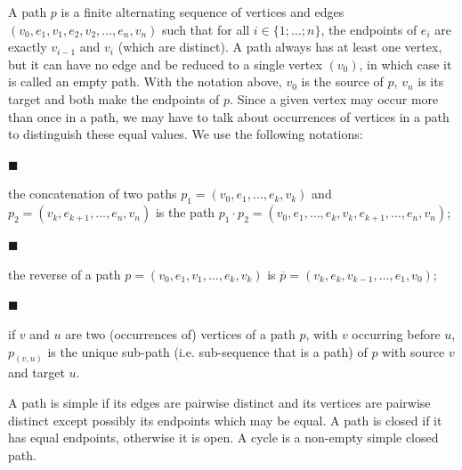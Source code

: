 \documentclass[10pt,a4paper]{amsart}
\begin{document}
 
A path $p$ is a finite alternating sequence of vertices and edges $(v_{0},e_{1},v_{1},e_{2},v_{2},\dots,e_{n},v_{n})$ such that for all $i\in\{1;\dots;n\}$, the endpoints of $e_{i}$ are exactly $v_{i-1}$ and $v_{i}$ (which are distinct). A path always has at least one vertex, but it can have no edge and be reduced to a single vertex $(v_{0})$, in which case it is called an empty path. With the notation above, $v_{0}$ is the source of $p$, $v_{n}$ is its target and both make the endpoints of $p$. Since a given vertex may occur more than once in a path, we may have to talk about occurrences of vertices in a path to distinguish these equal values. We use the following notations:\par
  
\par\noindent  $\blacksquare$ 
 
the concatenation of two paths $p_{1}=(v_{0},e_{1},\dots,e_{k},v_{k})$ and $p_{2}=(v_{k},e_{k+1},\dots,e_{n},v_{n})$ is the path $p_{1}\cdot p_{2}=(v_{0},e_{1},\dots,e_{k},v_{k},e_{k+1},\dots,e_{n},v_{n})$;\par
 
 
 
\par\noindent  $\blacksquare$ 
 
the reverse of a path $p=(v_{0},e_{1},v_{1},\dots,e_{k},v_{k})$ is $\overline{p}=(v_{k},e_{k},v_{k-1},\dots,e_{1},v_{0})$;\par
 
 
 
\par\noindent  $\blacksquare$ 
 
if $v$ and $u$ are two (occurrences of) vertices of a path $p$, with $v$ occurring before $u$, ${p}_{(v,u)}$ is the unique sub-path (i.e. sub-sequence that is a path) of $p$ with source $v$ and target $u$.\par
 
 
  
 
 
A path is simple if its edges are pairwise distinct and its vertices are pairwise distinct except possibly its endpoints which may be equal. A path is closed if it has equal endpoints, otherwise it is open. A cycle is a non-empty simple closed path.\par
 
\end{document}
